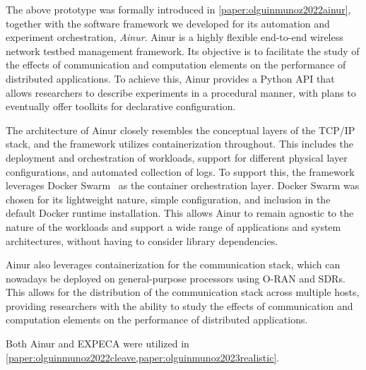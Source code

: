 The above prototype was formally introduced in \cref{paper:olguinmunoz2022ainur}, together with the software framework we developed for its automation and experiment orchestration, \emph{Ainur}.
Ainur is a highly flexible end-to-end wireless network testbed management framework.
Its objective is to facilitate the study of the effects of communication and computation elements on the performance of distributed applications.
To achieve this, Ainur provides a Python \gls{API} that allows researchers to describe experiments in a procedural manner, with plans to eventually offer toolkits for declarative configuration.

The architecture of Ainur closely resembles the conceptual layers of the \acs{TCP}/\acs{IP} stack, and the framework utilizes containerization throughout.
This includes the deployment and orchestration of workloads, support for different physical layer configurations, and automated collection of logs.
To support this, the framework leverages Docker Swarm~\cite{docker,merkel2014docker,Swarm2021} as the container orchestration layer.
Docker Swarm was chosen for its lightweight nature, simple configuration, and inclusion in the default Docker runtime installation.
This allows Ainur to remain agnostic to the nature of the workloads and support a wide range of applications and system architectures, without having to consider library dependencies.

Ainur also leverages containerization for the communication stack, which can nowadays be deployed on general-purpose processors using \gls{O-RAN} and \glspl{SDR}.
This allows for the distribution of the communication stack across multiple hosts, providing researchers with the ability to study the effects of communication and computation elements on the performance of distributed applications.

Both Ainur and \gls{EXPECA} were utilized in \cref{paper:olguinmunoz2022cleave,paper:olguinmunoz2023realistic}.
